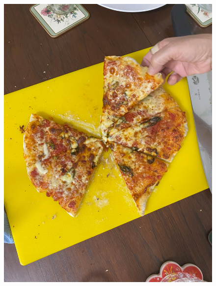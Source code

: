 \documentclass[]{article}
\begin{document}
\newpage\begin{figure}[H]
\begin{center}\hyperref[rec:Margherita Pizza]{\includegraphics[keepaspectratio,width=\textwidth,height=\textheight]{Gallery/Margherita Pizza}}\caption*{}\label{fig:Margherita Pizza}\end{center}
\end{figure}
\end{document}
